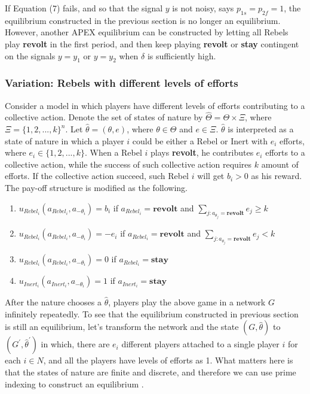 \documentclass[12pt,letterpaper]{article}
\theoremstyle{definition}
\theoremstyle{remark}
\theoremstyle{claim}
\begin{document}
If Equation (7) fails, and so that the signal $y$ is not noisy, says $p_{1s}=p_{2f}=1$, the equilibrium constructed in the previous section is no longer an equilibrium. However, another APEX equilibrium can be constructed by letting all Rebels play \textbf{revolt} in the first period, and then keep playing \textbf{revolt} or \textbf{stay} contingent on the signals $y=y_1$ or $y=y_2$ when $\delta$ is sufficiently high.

\subsubsection{Variation: Rebels with different levels of efforts}

Consider a model in which players have different levels of efforts contributing to a collective action. Denote the set of states of nature by $\hat{\Theta}=\Theta \times \Xi$, where $\Xi=\{1,2,...,k\}^n$. Let $\hat{\theta}=(\theta,e)$, where $\theta\in \Theta$ and $e\in \Xi$. $\hat{\theta}$ is interpreted as a state of nature in which a player $i$ could be either a Rebel or Inert with $e_i$ efforts, where $e_i\in \{1,2,...,k\}$. When a Rebel $i$ plays \textbf{revolt}, he contributes $e_i$ efforts to a collective action, while the success of such collective action requires $k$ amount of efforts. If the collective action succeed, such Rebel $i$ will get $b_i>0$ as his reward. The pay-off structure is modified as the following.
\begin{enumerate}
\item $u_{Rebel_i}(a_{Rebel_i},a_{-\theta_i})=b_i$ if $a_{Rebel_i}=\textbf{revolt}$ and $\sum_{j:a_{\theta_j}=\textbf{revolt}}e_j\geq k$
\item $u_{Rebel_i}(a_{Rebel_i},a_{-\theta_i})=-e_i$ if $a_{Rebel_i}=\textbf{revolt}$ and $\sum_{j:a_{\theta_j}=\textbf{revolt}}e_j< k$
\item $u_{Rebel_i}(a_{Rebel_i},a_{-\theta_i})=0$ if $a_{Rebel_i}=\textbf{stay}$
\item $u_{Inert_i}(a_{Inert_i},a_{-\theta_i})=1$ if $a_{Inert_i}=\textbf{stay}$
\end{enumerate}

After the nature chooses a $\hat{\theta}$, players play the above game in a network $G$ infinitely repeatedly. To see that the equilibrium constructed in previous section is still an equilibrium, let's transform the network and the state $(G,\hat{\theta})$ to $(G^{'},\hat{\theta}^{'})$ in which, there are $e_i$ different players attached to a single player $i$ for each $i\in N$, and all the players have levels of efforts as 1. What matters here is that the states of nature are finite and discrete, and therefore we can use prime indexing to construct an equilibrium .
\end{document}
